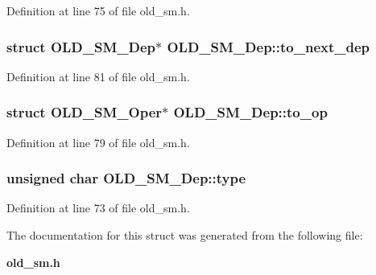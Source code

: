 Definition at line 75 of file old\_\-sm.h.
\subsubsection{\setlength{\rightskip}{0pt plus 5cm}struct \bf{OLD\_\-SM\_\-Dep}$\ast$ \bf{OLD\_\-SM\_\-Dep::to\_\-next\_\-dep}}\label{structOLD__SM__Dep_a16d36393a79d02257545dc01b375ab9}




Definition at line 81 of file old\_\-sm.h.
\subsubsection{\setlength{\rightskip}{0pt plus 5cm}struct \bf{OLD\_\-SM\_\-Oper}$\ast$ \bf{OLD\_\-SM\_\-Dep::to\_\-op}}\label{structOLD__SM__Dep_05f54fe3fefced2dbf8851c530144510}




Definition at line 79 of file old\_\-sm.h.
\subsubsection{\setlength{\rightskip}{0pt plus 5cm}unsigned char \bf{OLD\_\-SM\_\-Dep::type}}\label{structOLD__SM__Dep_da01e844428883777ea1a4b498d989cf}




Definition at line 73 of file old\_\-sm.h.

The documentation for this struct was generated from the following file:\begin{CompactItemize}
\item 
\bf{old\_\-sm.h}\end{CompactItemize}
